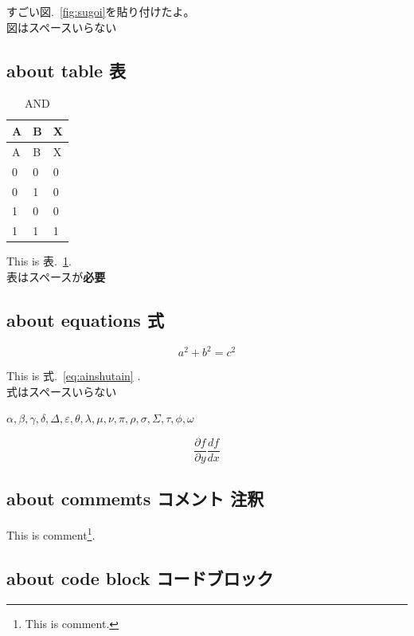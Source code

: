 \documentclass[
  10pt,
  a4paper,
  pandoc,
  titlepage]{ltjsarticle}
\begin{document}
すごい図.~\ref{fig:sugoi}を貼り付けたよ。\\
図はスペースいらない

\hypertarget{about-table-ux8868}{%
\subsection{about table 表}\label{about-table-ux8868}}

\hypertarget{tbl:AND_yeah}{}
\begin{longtable}[]{@{}lll@{}}
\caption{\label{tbl:AND_yeah}AND}\tabularnewline
\toprule
A & B & X\tabularnewline
\midrule
\endfirsthead
\toprule
A & B & X\tabularnewline
\midrule
\endhead
0 & 0 & 0\tabularnewline
0 & 1 & 0\tabularnewline
1 & 0 & 0\tabularnewline
1 & 1 & 1\tabularnewline
\bottomrule
\end{longtable}

This is 表.~\ref{tbl:AND_yeah}.\\
表はスペースが\textbf{必要}

\hypertarget{about-equations-ux5f0f}{%
\subsection{about equations 式}\label{about-equations-ux5f0f}}

\protect\hypertarget{eq:ainshutain}{}{\begin{equation}
a^2+b^2=c^2
\label{eq:ainshutain}\end{equation}}

This is 式.~\ref{eq:ainshutain} .\\
式はスペースいらない

\(\alpha, \beta, \gamma, \delta, \Delta, \varepsilon, \theta, \lambda, \mu, \nu, \pi, \rho, \sigma, \Sigma, \tau, \phi, \omega\)

\[\frac{\partial f}{\partial y} \frac{d f}{d x}\]

\hypertarget{about-commemts-ux30b3ux30e1ux30f3ux30c8-ux6ce8ux91c8}{%
\subsection{about commemts コメント
注釈}\label{about-commemts-ux30b3ux30e1ux30f3ux30c8-ux6ce8ux91c8}}

This is comment\footnote{This is comment.}.

\clearpage

\hypertarget{about-code-block-ux30b3ux30fcux30c9ux30d6ux30edux30c3ux30af}{%
\subsection{about code block
コードブロック}\label{about-code-block-ux30b3ux30fcux30c9ux30d6ux30edux30c3ux30af}}
\end{document}

